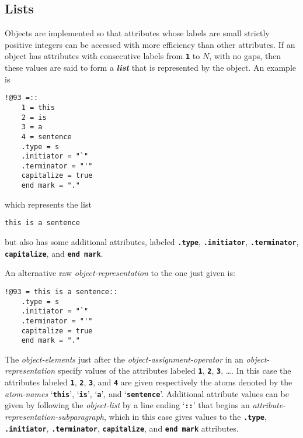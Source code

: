 \documentclass[12pt]{article}
\newcommand{\TT}[1]{{\tt \bfseries #1}}
\newcommand{\key}[1]{{\bf \em #1}\index{#1}}
\newenvironment{indpar}[1][0.3in]%
	{\begin{list}{}%
		     {\setlength{\itemsep}{0in}%
		      \setlength{\topsep}{0in}%
		      \setlength{\parsep}{1ex}%
		      \setlength{\labelwidth}{#1}%
		      \setlength{\leftmargin}{#1}%
		      \addtolength{\leftmargin}{\labelsep}}%
	 \item}%
	{\end{list}}
\begin{document}
\subsection{Lists}

Objects are implemented so that attributes whose labels are small
strictly positive integers can be accessed with more efficiency
than other attributes.  If an object has attributes with consecutive
labels from \TT{1} to $N$, with no gaps,
then these values are said to form a \key{list} that is represented
by the object.  An example is

\begin{indpar}\begin{verbatim}
!@93 =::
    1 = this
    2 = is
    3 = a
    4 = sentence
    .type = s
    .initiator = "`"
    .terminator = "'"
    capitalize = true
    end mark = "."
\end{verbatim}\end{indpar}

which represents the list
\begin{indpar}
\verb|this is a sentence|
\end{indpar}

but also has some additional attributes, labeled \TT{.type},
\TT{.initiator}, \TT{.terminator},
\TT{cap\-it\-al\-ize}, and \TT{end mark}.

An alternative raw {\em object-representation}
to the one just given is:

\begin{indpar}\begin{verbatim}
!@93 = this is a sentence::
    .type = s
    .initiator = "`"
    .terminator = "'"
    capitalize = true
    end mark = "."
\end{verbatim}\end{indpar}

The {\em object-elements} just after the {\em object-assignment-operator}
in an {\em object-representation} specify
values of the attributes labeled \TT{1}, \TT{2},
\TT{3}, \ldots.  In this case the attributes labeled
\TT{1}, \TT{2}, \TT{3}, and \TT{4} are given respectively the
atoms denoted by the {\em atom-names} `\TT{this}', `\TT{is}',
`\TT{a}', and `\TT{sentence}'.  Additional attribute values can be given by
following the {\em object-list} by a line ending `\TT{::}' that begins an
{\em attribute-representation-subparagraph}, which in this case
gives values to the \TT{.type}, \TT{.initiator}, \TT{.terminator},
\TT{capitalize}, and \TT{end mark} attributes.
\end{document}
